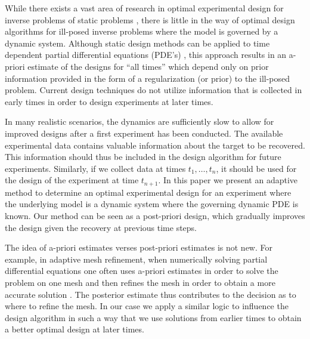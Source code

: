 \documentclass[11pt]{article}
\begin{document}
While there exists a vast area of research in optimal experimental design for  inverse problems  of static problems \cite{Haber2011,Haber2008,Haber2010,Bardow2008,Chaloner1995,Curtis1999,Atkinson1992,Pukelsheim1993a,Ajo-Franklin2009}, there is little in the way of optimal design algorithms for ill-posed inverse problems where the model is governed by a dynamic system. Although static design methods can be applied to time dependent partial differential equations (PDE's) \cite{Alexanderian2014,Haber2011}, this approach results in an a-priori estimate of the designs for ``all times''  which depend only on prior information provided in the form of a regularization (or prior) to the ill-posed problem.  Current design techniques do not utilize information that is collected in early times in order
 to design experiments at later times.
 
 In many realistic scenarios, the dynamics are sufficiently slow to allow for improved designs after a first experiment has been conducted. The available experimental data contains valuable information about the target to be recovered. This information should thus be included in the design algorithm for future experiments. 
 Similarly, if we  collect data at times $t_{1},\ldots , t_{n}$, it should be used for the design of the experiment at time $t_{n+1}$.
 In this paper we present an adaptive method to determine an optimal experimental design for an experiment where the underlying model is a dynamic system where the governing dynamic PDE is known.
 Our method can be seen as a post-priori design, which gradually improves the design given the recovery at previous time steps. 
  
 The idea of a-priori estimates verses post-priori  estimates is not new. For example, in adaptive mesh refinement, when numerically 
solving partial differential
equations one often uses a-priori estimates in order to solve the problem on one mesh 
and then refines the mesh in order to obtain a more accurate solution \cite{MultiGrid}. The posterior estimate thus contributes to the decision as to where to refine the mesh. In our case we apply a similar logic to influence the design algorithm in such a way that we use solutions from earlier times to obtain a better optimal design at later times. 
\end{document}
